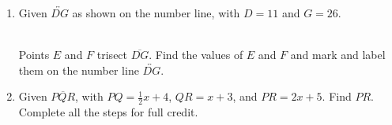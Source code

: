 \documentclass[12pt, twoside]{article}
\begin{document}
\begin{enumerate}
\newpage
  \item Given $\overleftrightarrow{DG}$ as shown on the number line, with $D=11$ and $G=26$. \\[15pt]
   \\[10pt]
  Points $E$ and $F$ trisect $\overline{DG}$. Find the values of $E$ and $F$ and mark and label them on the number line $\overleftrightarrow{DG}$. \vspace{6cm}

  \item Given $\overline{PQR}$, with $PQ=\frac{1}{2} x+4$, $QR=x+3$, and $PR=2x+5$. Find ${PR}$.\\
  Complete all the steps for full credit. \smallskip
  \vspace{9cm}

\end{enumerate}
\end{document}
